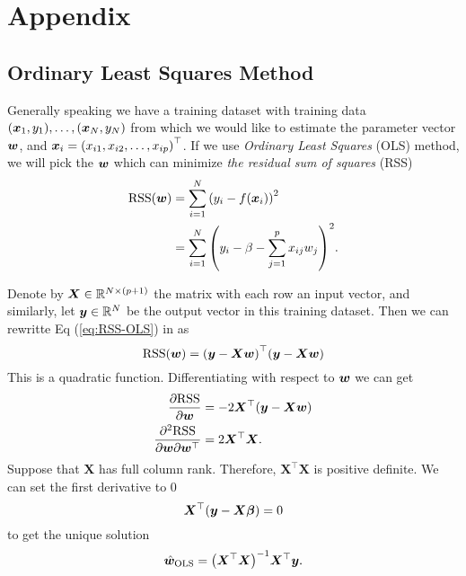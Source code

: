 \section{Appendix}\label{app}

\subsection{Ordinary Least Squares Method}\label{app:OLS}
Generally speaking we have a training dataset with training data \((\bm{x}_1, y_1), \dots, 
(\bm{x}_N, y_N)\) from which we would like to estimate the parameter vector \(\bm{w}\), and
\(\bm{x}_i = {(x_{i1}, x_{i2}, \dots, x_{ip})}^\top\).
If we use \emph{Ordinary Least Squares} (OLS) method, we will pick the \(\bm{w}\) which can
minimize \emph{the residual sum of squares} (RSS)
\begin{equation}\label{eq:RSS-OLS}
    \begin{aligned}
        \mathrm{RSS} (\bm{w}) &= \sum_{i=1}^N {(y_i - f(\bm{x}_i))}^2 \\
        &= \sum_{i=1}^N {\left( y_i - \beta - \sum_{j=1}^p x_{ij}w_j \right)}^2.
    \end{aligned}
\end{equation}

Denote by \(\bm{X} \in \mathbb{R}^{N \times (p + 1)}\) the matrix with each row an input vector, and similarly, let 
\(\bm{y} \in \mathbb{R}^N\) be the output vector in this training dataset. Then we can rewritte Eq (\ref{eq:RSS-OLS}) in
as
\begin{equation}\label{eq:RSS-OLS-mat}
    \mathrm{RSS}(\bm{w}) = {(\bm{y} - \bm{Xw})}^\top(\bm{y} - \bm{Xw}) 
\end{equation}
This is a quadratic function. Differentiating with respect to \(\bm{w}\) we can get 
\begin{equation}
    \begin{aligned}
        \pdv{\mathrm{RSS}}{\bm{w}} &= -2 \bm{X}^\top (\bm{y} - \bm{Xw}) \\
        \pdv{\mathrm{RSS}}{\bm{w}}{\bm{w}^\top} &= 2\bm{X}^\top \bm{X}.
    \end{aligned}
\end{equation}
Suppose that \(\bm{X}\) has full column rank. Therefore, \(\bm{X}^\top\bm{X}\) is positive definite.
We can set the first derivative to \(0\)
\begin{equation}
    \bm{X}^\top (\bm{y} - \bm{X\beta}) = 0
\end{equation}
to get the unique solution
\begin{equation}\label{eq:solution-OLS-app}
    \hat{\bm{w}}_{\text{OLS}} = {\left(\bm{X}^\top \bm{X}\right)}^{-1} \bm{X}^\top \bm{y}.
\end{equation}

